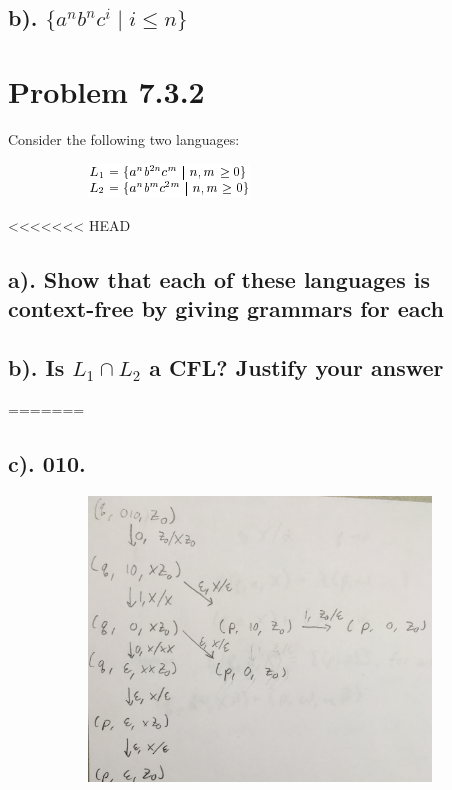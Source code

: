 \documentclass[20pt]{article} %
\begin{document}
\subsection{b). $\{ a^{n} b^{n} c^{i} \mid i \leq n \}$}
\section{Problem 7.3.2}
Consider the following two languages:
\begin{figure}[!htbp]
  	\centering
   	\begin{subfigure}[p]{0.33\linewidth}
    	\includegraphics[width=\linewidth]{./figures/HW7fig2.png}
   	\end{subfigure}
\end{figure} 
<<<<<<< HEAD
\subsection{a). Show that each of these languages is context-free by giving grammars for each}
\subsection{b). Is $L_1 \cap L_2$ a CFL? Justify your answer}
=======
\newpage
\subsection{c). 010.}
\begin{figure}[!htbp]
  	\centering
   	\begin{subfigure}[p]{0.6\linewidth}
    	\includegraphics[width=\linewidth]{./figures/h7-3.jpg}
   	\end{subfigure}
\end{figure} 
\end{document}
